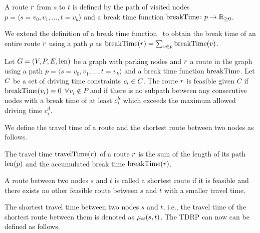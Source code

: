 \begin{definition}[Route]
	A route $r$ from $s$ to $t$ is defined by the path of visited nodes $p = \langle s=v_0,v_1,\dots,t=v_k \rangle$ and a break time function $\operatorname{breakTime}\colon p \rightarrow \mathbb{R}_{\ge 0}$.
\end{definition}

We extend the definition of a break time function \breakTime\ to obtain the break time of an entire route $r$ using a path $p$ as $\operatorname{breakTime}(r) = \sum_{v \in p}{\operatorname{breakTime}(v)}$.

\begin{samepage}
	\begin{definition}
		Let $G=(V,P,E,\operatorname{len})$ be a graph with parking nodes and $r$ a route in the graph using a path $p = \langle s=v_0,v_1,...,t=v_k \rangle$ and a break time function $\operatorname{breakTime}$. Let $C$ be a set of driving time constraints $c_i \in C$. The route $r$ is feasible given $C$ if $\operatorname{breakTime}(v_i) = 0$ $\forall v_i \notin P$ and if there is no subpath between any consecutive nodes with a break time of at least $c_i^b$ which exceeds the maximum allowed driving time $c_i^d$.
	\end{definition}
\end{samepage}

We define the travel time of a route and the shortest route between two nodes as follows.

\begin{definition}
	The travel time $\operatorname{travelTime}(r)$ of a route $r$ is the sum of the length of its path $\operatorname{len}(p)$ and the accumulated break time $\operatorname{breakTime}(r)$.
\end{definition}

\begin{definition}
	A route between two nodes $s$ and $t$ is called a shortest route if it is feasible and there exists no other feasible route between $s$ and $t$ with a smaller travel time.
\end{definition}

The shortest travel time between two nodes $s$ and $t$, i.e., the travel time of the shortest route between them is denoted as $\mu_{tt}(s,t)$. The TDRP can now can be defined as follows.

\begin{namedproblem}
\end{namedproblem}

